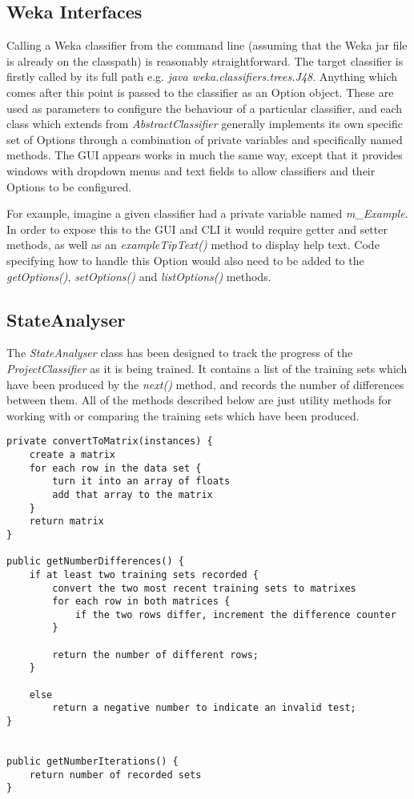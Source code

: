 \subsection{Weka Interfaces}
Calling a Weka classifier from the command line (assuming that the Weka jar file is already on the classpath) is reasonably straightforward. The target classifier is firstly called by its full path e.g.  \textit{java weka.classifiers.trees.J48}. Anything which comes after this point is passed to the classifier as an Option object. These are used as parameters to configure the behaviour of a particular classifier, and each class which extends from \textit{AbstractClassifier} generally implements its own specific set of Options through a combination of private variables and specifically named methods. The GUI appears works in much the same way, except that it provides windows with dropdown menus and text fields to allow classifiers and their Options to be configured.  

For example, imagine a given classifier had a private variable named \textit{m\_Example}. In order to expose this to the GUI and CLI it would require getter and setter methods, as well as an \textit{exampleTipText()} method to display help text. Code specifying how to handle this Option would also need to be added to the \textit{getOptions()}, \textit{setOptions()} and \textit{listOptions()} methods. 

\subsection{StateAnalyser}
The \textit{StateAnalyser} class has been designed to track the progress of the \textit{ProjectClassifier} as it is being trained. It contains a list of the training sets which have been produced by the \textit{next()} method, and records the number of differences between them. All of the methods described below are just utility methods for working with or comparing the training sets which have been produced.

\begin{footnotesize}
\begin{verbatim}
private convertToMatrix(instances) {
    create a matrix
    for each row in the data set {
        turn it into an array of floats
        add that array to the matrix
    }
    return matrix
}

public getNumberDifferences() {
    if at least two training sets recorded {
        convert the two most recent training sets to matrixes
        for each row in both matrices {
            if the two rows differ, increment the difference counter
        }

        return the number of different rows;
    }

    else
        return a negative number to indicate an invalid test;
}


public getNumberIterations() {
    return number of recorded sets
}
\end{verbatim}
\end{footnotesize}
